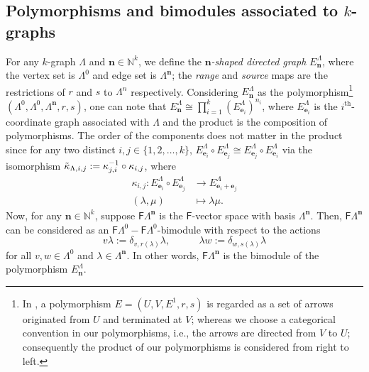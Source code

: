 \documentclass[12pt]{amsart}
\newcommand{\N}{\mathbf{n}}
\theoremstyle{definition}
\theoremstyle{remark}
\begin{document}
\subsection{Polymorphisms and bimodules associated to $k$-graphs}\label{ssec polymorphism}
For any $k$-graph $\Lambda$ and $\N\in \mathbb{N}^k$, we define the \emph{$\N$-shaped directed graph} $E_\N^\Lambda$, where the vertex set is $\Lambda^0$ and edge set is $\Lambda^\N$; the \emph{range} and \emph{source} maps are the restrictions of $r$ and $s$ to $\Lambda^n$ respectively. Considering $E_\N^\Lambda$ as the polymorphism\footnote{In \cite{ART}, a polymorphism $E=(U,V,E^1,r,s)$ is regarded as a set of arrows originated from $U$ and terminated at $V$; whereas we choose a categorical convention in our polymorphisms, i.e., the arrows are directed from $V$ to $U$; consequently the product of our polymorphisms is considered from right to left.} $(\Lambda^0,\Lambda^0,\Lambda^\N,r,s)$, one can note that $E_\N^\Lambda\cong \displaystyle{\prod_{i=1}^{k}}(E_{\mathbf{e}_i}^\Lambda)^{n_i}$, where $E_{\mathbf{e}_i}^\Lambda$ is the $i^{\text{th}}$-coordinate graph associated with $\Lambda$ and the product is the composition of polymorphisms. The order of the components does not matter in the product since for any two distinct $i,j\in \{1,2,\ldots,k\}$, $E_{\mathbf{e}_i}^\Lambda \circ E_{\mathbf{e}_j}^\Lambda\cong E_{\mathbf{e}_j}^\Lambda \circ E_{\mathbf{e}_i}^\Lambda$ via the isomorphism $\Tilde{\kappa}_{\Lambda,i,j}:=\kappa_{j,i}^{-1}\circ \kappa_{i,j}$, where 
\begin{align*}
    \kappa_{i,j}:E_{\mathbf{e}_i}^\Lambda\circ E_{\mathbf{e}_j}^\Lambda &\longrightarrow E_{\mathbf{e}_i+\mathbf{e}_j}^\Lambda\\
    (\lambda,\mu)&\longmapsto \lambda\mu.
\end{align*}
Now, for any $\N\in \mathbb{N}^k$, suppose $\mathsf{F}\Lambda^\N$ is the $\mathsf{F}$-vector space with basis $\Lambda^\N$. Then, $\mathsf{F}\Lambda^\N$ can be considered as an $\mathsf{F}\Lambda^0-\mathsf{F}\Lambda^0$-bimodule with respect to the actions
\[v\lambda:=\delta_{v,r(\lambda)}\lambda,~~~~~~~~~~~~~ \lambda w:=\delta_{w,s(\lambda)}\lambda\] for all $v,w\in \Lambda^0$ and $\lambda\in \Lambda^\N$. In other words, $\mathsf{F}\Lambda^\N$ is the bimodule of the polymorphism $E_\N^\Lambda$. 
 
\end{document}
